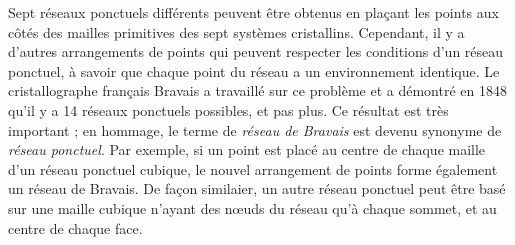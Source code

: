 \begin{table}
\caption{Systèmes cristallins et résaux de Bravais}
\label{tab:syscrist}
\end{table}

Sept réseaux ponctuels différents peuvent être obtenus en plaçant les
points aux côtés des mailles primitives des sept systèmes cristallins. Cependant,
il y a d'autres arrangements de points qui peuvent respecter les conditions d'un
réseau ponctuel, à savoir que chaque point du réseau a un environnement
identique. Le cristallographe français Bravais a travaillé sur ce problème et a
démontré en 1848 qu'il y a 14 réseaux ponctuels possibles, et pas plus. Ce
résultat est très important ; en hommage, le terme de \emph{réseau de Bravais}
est devenu synonyme de \emph{réseau ponctuel}. Par exemple, si un point est placé
au centre de chaque maille d'un réseau ponctuel cubique, le nouvel arrangement de
points forme également un réseau de Bravais. De façon similaier, un autre réseau
ponctuel peut être basé sur une maille cubique n'ayant des nœuds du réseau qu'à
chaque sommet, et au centre de chaque face.

